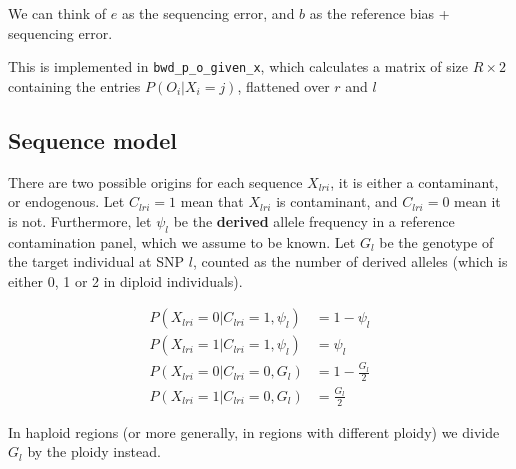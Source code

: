 \documentclass[10pt,a4paper]{article}
\begin{document}
We can think of $e$ as the sequencing error, and $b$ as the reference bias + sequencing error.

This is implemented in \texttt{bwd\_p\_o\_given\_x}, which calculates a matrix of size $R \times 2$ containing the entries
$P(O_i | X_i = j)$, flattened over $r$ and $l$

\subsection*{Sequence model}

There are two possible origins for each sequence $X_{lri}$, it is either a contaminant, or endogenous. 
Let $C_{lri} =1 $ mean that $X_{lri}$ is contaminant, and $C_{lri} =0 $ mean it is not. Furthermore, let $\psi_l$ be the \textbf{derived} allele frequency in a reference contamination panel, which we assume to be known. Let $G_l$ be the genotype of the target individual at SNP $l$, counted as the number of derived alleles (which is either 0, 1 or 2 in diploid individuals).


\begin{align}
P(X_{lri} = 0 | C_{lri} = 1, \psi_l) &= 1 - \psi_l\nonumber\\ 
P(X_{lri} = 1 | C_{lri} = 1, \psi_l) &= \psi_l\nonumber\\ 
P(X_{lri} = 0 | C_{lri} = 0, G_l) &= 1 - \frac{G_l}{2}\nonumber\\ 
P(X_{lri} = 1 | C_{lri} = 0, G_l) &= \frac{G_l}{2}
\end{align}

In haploid regions (or more generally, in regions with different ploidy) we divide $G_l$ by the ploidy instead.


\end{document}
